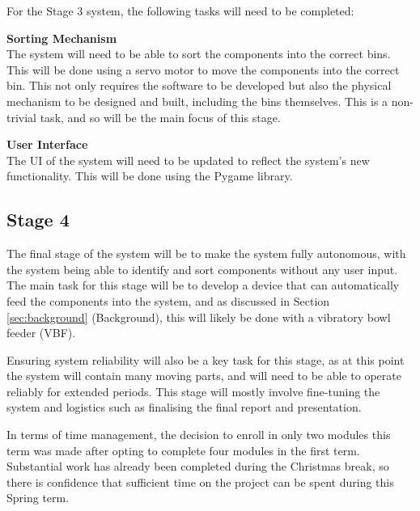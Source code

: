 For the Stage 3 system, the following tasks will need to be completed:
\begin{mylist}
    \item \textbf{Sorting Mechanism} \\
    The system will need to be able to sort the components into the correct bins. This will be done using a servo motor to move the components into the correct bin.
    This not only requires the software to be developed but also the physical mechanism to be designed and built, including the bins themselves.
    This is a non-trivial task, and so will be the main focus of this stage.
    \item \textbf{User Interface} \\
    The UI of the system will need to be updated to reflect the system's new functionality. This will be done using the Pygame library\cite{pygamedoc}.
\end{mylist}

\subsection{Stage 4}
The final stage of the system will be to make the system fully autonomous, with the system being able to identify and sort components without any user input.
The main task for this stage will be to develop a device that can automatically feed the components into the system, and as 
discussed in Section \ref*{sec:background} (Background), this will likely be done with a vibratory bowl feeder (VBF).

Ensuring system reliability will also be a key task for this stage, as at this point the system will contain many moving parts, and will need to be able to
operate reliably for extended periods. This stage will mostly involve fine-tuning the system and logistics such as
finalising the final report and presentation.

\noindent
In terms of time management, the decision to enroll in only two modules this term was made after opting to complete four modules in the first term. Substantial work has already been completed
during the Christmas break, so there is confidence that sufficient time on the project can be spent during this Spring term.

